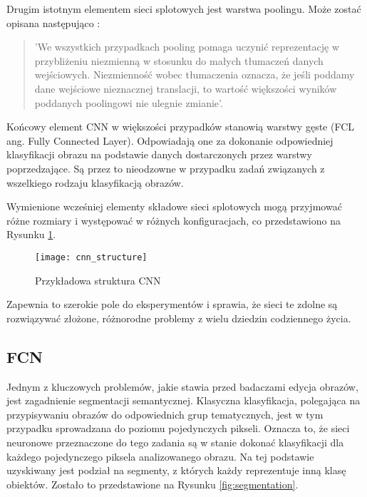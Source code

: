     Drugim istotnym elementem sieci splotowych jest warstwa poolingu. Może zostać opisana następująco \cite{deeplearn}:
    \begin{quote}
      'We wszystkich przypadkach pooling pomaga uczynić reprezentację w przybliżeniu niezmienną w stosunku do małych tłumaczeń danych wejściowych. Niezmienność wobec tłumaczenia oznacza, że jeśli poddamy dane wejściowe nieznacznej translacji, to wartość większości wyników poddanych poolingowi nie ulegnie zmianie'.
    \end{quote}

    Końcowy element CNN w większości przypadków stanowią warstwy gęste (FCL ang. Fully Connected Layer). Odpowiadają one za dokonanie odpowiedniej klasyfikacji obrazu na podstawie danych dostarczonych przez warstwy poprzedzające. Są przez to nieodzowne w przypadku zadań związanych z wszelkiego rodzaju klasyfikacją obrazów.

    Wymienione wcześniej elementy składowe sieci splotowych mogą przyjmować różne rozmiary i występować w różnych konfiguracjach, co przedstawiono na Rysunku \ref{fig:cnn_structure}.
    \begin{figure}[h]
     \centering
     \texttt{[image: cnn\_structure]}
     \caption[Przykładowa struktura CNN - źródło: \url{https://www.mathworks.com/solutions/deep-learning/convolutional-neural-network.html}]{Przykładowa struktura CNN}
     \label{fig:cnn_structure}
    \end{figure}
    \newline
    Zapewnia to szerokie pole do eksperymentów i sprawia, że sieci te zdolne są rozwiązywać złożone, różnorodne problemy z wielu dziedzin codziennego życia.

  \subsection{FCN}

   Jednym z kluczowych problemów, jakie stawia przed badaczami edycja obrazów, jest zagadnienie segmentacji semantycznej. Klasyczna klasyfikacja, polegająca na przypisywaniu obrazów do odpowiednich grup tematycznych, jest w tym przypadku sprowadzana do poziomu pojedynczych pikseli. Oznacza to, że sieci neuronowe przeznaczone do tego zadania są w stanie dokonać klasyfikacji dla każdego pojedynczego piksela analizowanego obrazu. Na tej podstawie uzyskiwany jest podział na segmenty, z których każdy reprezentuje inną klasę obiektów. Zostało to przedstawione na Rysunku \ref{fig:segmentation}.

